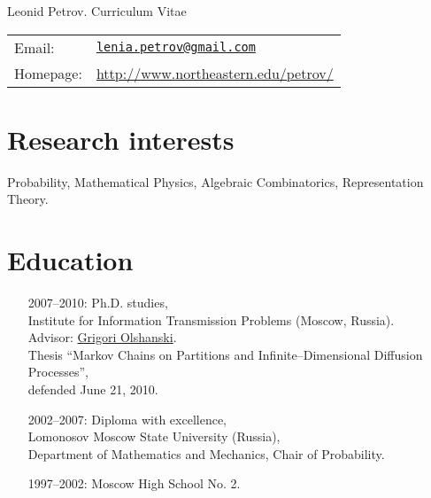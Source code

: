 \documentclass[letterpaper,11pt]{article}
\def\name{Leonid Petrov. Curriculum Vitae}
\begin{document}
{\huge \name}


\vspace{0.25in}

\begin{minipage}{0.45\linewidth}
\end{minipage}
\begin{minipage}{0.45\linewidth}
  \begin{tabular}{ll}
    Email: & 
    \href{mailto:lenia.petrov@gmail.com}{\tt lenia.petrov@gmail.com}
    \\
    Homepage: & \url{http://www.northeastern.edu/petrov/} \\
  \end{tabular}
\end{minipage}

\section*{Research interests}

Probability, Mathematical Physics, Algebraic Combinatorics, Representation Theory.

\section*{Education}

\begin{itemize}
  \item[2007--2010:]
  Ph.D. studies,\\Institute for Information Transmission Problems (Moscow, Russia).
  \\
  Advisor: \href{http://www.iitp.ru/en/userpages/88/}{Grigori Olshanski}.\\
  Thesis ``Markov Chains on Partitions and Infinite--Dimensional Diffusion Processes'',\\
  defended
  June 21, 2010.

  \item[2002--2007:]
  Diploma with excellence,\\
  Lomonosov Moscow State University (Russia),\\ Department of Mathematics and Mechanics, Chair of Probability.

  \item 
  [1997--2002:] Moscow High School No. 2.
\end{itemize}
\end{document}
